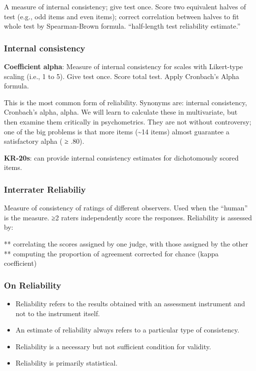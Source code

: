 \documentclass[
  english,
]{book}
\providecommand{\tightlist}{%
  \setlength{\itemsep}{0pt}\setlength{\parskip}{0pt}}
\begin{document}
A measure of internal consistency; give test once. Score two equivalent halves of test (e.g., odd items and even items); correct correlation between halves to fit whole test by Spearman-Brown formula.
``half-length test reliability estimate.''

\hypertarget{internal-consistency-1}{%
\subsubsection{Internal consistency}\label{internal-consistency-1}}

\textbf{Coefficient alpha}: Measure of internal consistency for scales with Likert-type scaling (i.e., 1 to 5). Give test once. Score total test. Apply Cronbach's Alpha formula.

This is the most common form of reliability. Synonyms are: internal consistency, Cronbach's alpha, alpha. We will learn to calculate these in multivariate, but then examine them critically in psychometrics. They are not without controversy; one of the big problems is that more items (\textasciitilde14 items) almost guarantee a satisfactory alpha ( ≥ .80).

\textbf{KR-20s}: can provide internal consistency estimates for dichotomously scored items.

\hypertarget{interrater-reliabiliy}{%
\subsubsection{Interrater Reliabiliy}\label{interrater-reliabiliy}}

Measure of consistency of ratings of different observers. Used when the ``human'' is the measure.
≥2 raters independently score the responses. Reliability is assessed by:

** correlating the scores assigned by one judge, with those assigned by the other
** computing the proportion of agreement corrected for chance (kappa coefficient)

\hypertarget{on-reliability}{%
\subsubsection{On Reliability}\label{on-reliability}}

\begin{itemize}
\tightlist
\item
  Reliability refers to the results obtained with an assessment instrument and not to the instrument itself.
\item
  An estimate of reliability always refers to a particular type of consistency.
\item
  Reliability is a necessary but not sufficient condition for validity.
\item
  Reliability is primarily statistical.
\end{itemize}
\end{document}
